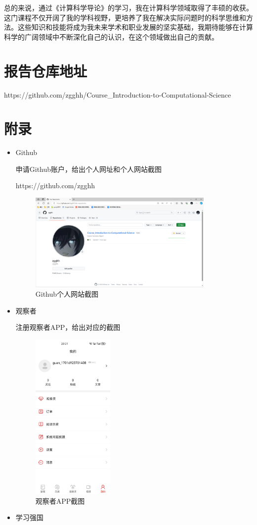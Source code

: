 \documentclass[square]{article}
\begin{document}
总的来说，通过《计算科学导论》的学习，我在计算科学领域取得了丰硕的收获。这门课程不仅开阔了我的学科视野，更培养了我在解决实际问题时的科学思维和方法。这些知识和技能将成为我未来学术和职业发展的坚实基础，我期待能够在计算科学的广阔领域中不断深化自己的认识，在这个领域做出自己的贡献。
\section{报告仓库地址}
https://github.com/zgghh/Course\_Introduction-to-Computational-Science
\section{附录}
\begin{itemize}
    \item Github
    
    申请Github账户，给出个人网址和个人网站截图\par
    https://github.com/zgghh\par
    \begin{figure}[h!]
    	\centering
    	\includegraphics[width=9cm]{github.png}
    	\caption{Github个人网站截图}
    	\label{fig:github}
    \end{figure}
    \pagebreak
   
    \item 观察者
    
    注册观察者APP，给出对应的截图
    
    \begin{figure}[h!]
    	\centering
    	\includegraphics[width=4cm]{viewer}
    	\caption{观察者APP截图}
    	\label{fig:viewer}
    \end{figure}
    \item 学习强国
    

\end{itemize}
\end{document}
